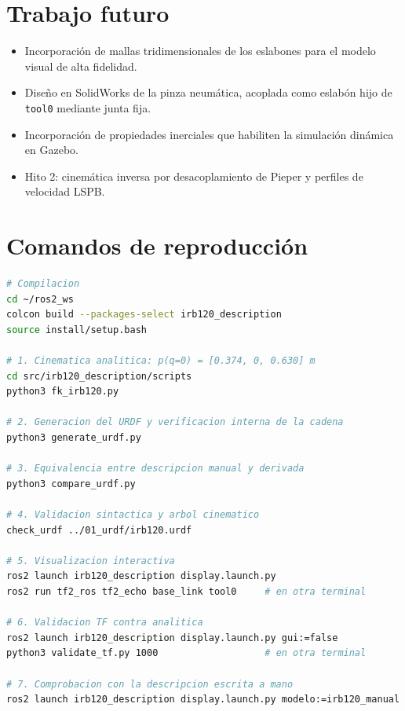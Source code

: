 \documentclass[11pt,a4paper]{article}
\begin{document}
\section{Trabajo futuro}

\begin{itemize}[leftmargin=*]
\item Incorporación de mallas tridimensionales de los eslabones para el
modelo visual de alta fidelidad.
\item Diseño en SolidWorks de la pinza neumática, acoplada como eslabón
hijo de \texttt{tool0} mediante junta fija.
\item Incorporación de propiedades inerciales que habiliten la
simulación dinámica en Gazebo.
\item Hito 2: cinemática inversa por desacoplamiento de Pieper y
perfiles de velocidad LSPB.
\end{itemize}

\appendix
\section{Comandos de reproducción}

\begin{lstlisting}[language=bash,caption={Secuencia completa de
verificación}]
# Compilacion
cd ~/ros2_ws
colcon build --packages-select irb120_description
source install/setup.bash

# 1. Cinematica analitica: p(q=0) = [0.374, 0, 0.630] m
cd src/irb120_description/scripts
python3 fk_irb120.py

# 2. Generacion del URDF y verificacion interna de la cadena
python3 generate_urdf.py

# 3. Equivalencia entre descripcion manual y derivada
python3 compare_urdf.py

# 4. Validacion sintactica y arbol cinematico
check_urdf ../01_urdf/irb120.urdf

# 5. Visualizacion interactiva
ros2 launch irb120_description display.launch.py
ros2 run tf2_ros tf2_echo base_link tool0     # en otra terminal

# 6. Validacion TF contra analitica
ros2 launch irb120_description display.launch.py gui:=false
python3 validate_tf.py 1000                   # en otra terminal

# 7. Comprobacion con la descripcion escrita a mano
ros2 launch irb120_description display.launch.py modelo:=irb120_manual
\end{lstlisting}
\end{document}
